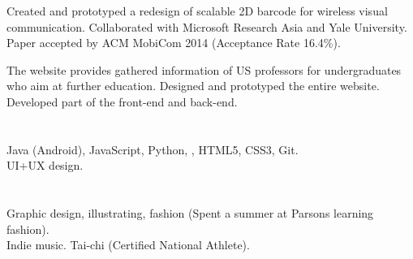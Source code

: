 \begin{resume}
\begin{position}
Created and prototyped a redesign of scalable 2D barcode for wireless visual communication. Collaborated with Microsoft Research Asia and Yale University. Paper accepted by ACM MobiCom 2014 (Acceptance Rate 16.4\%).
\end{position}

\begin{position}
The website provides gathered information of US professors for undergraduates who aim at further education. Designed and prototyped the entire website. Developed part of the front-end and back-end. 
\end{position}



\section{}
Java (Android), JavaScript, Python, \Cplusplus, HTML5, CSS3, Git.\\
UI+UX design.

\section{}
Graphic design, illustrating, fashion (Spent a summer at Parsons learning fashion). \\
Indie music. Tai-chi (Certified National Athlete).

\end{resume}

